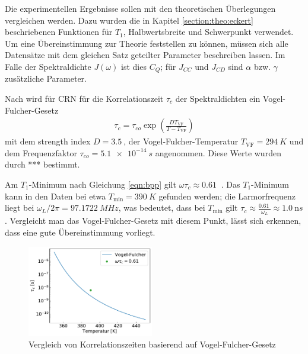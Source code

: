Die experimentellen Ergebnisse sollen mit den theoretischen Überlegungen vergleichen werden. Dazu wurden die in Kapitel \ref{section:theo:eckert} beschriebenen Funktionen für $T_1$, Halbwertsbreite und Schwerpunkt verwendet. Um eine Übereinstimmung zur Theorie feststellen zu können, müssen sich alle Datensätze mit dem gleichen Satz geteilter Parameter beschreiben lassen. Im Falle der Spektraldichte $J(\omega)$ ist dies $C_Q$; für $J_{CC}$ und $J_{CD}$ sind $\alpha$ bzw. $\gamma$ zusätzliche Parameter.


Nach \cite{PIMENOV199793} wird für CRN für die Korrelationszeit $\tau_c$ der Spektraldichten ein Vogel-Fulcher-Gesetz
\begin{align}
	\tau_c = \tau_{co} \exp \left( \frac{D T_\text{VF}}{T-T_\text{VF}} \right)
\end{align}
mit dem strength index $D = \SI{3.5}{}$, der Vogel-Fulcher-Temperatur $T_\text{VF} = \SI{294}{K}$ und dem Frequenzfaktor $\tau_{co} = \SI{5.1e-14}{s}$ angenommen. Diese Werte wurden durch *** bestimmt.

Am $T_1$-Minimum nach Gleichung \eqref{eqn:bpp} gilt $\omega \tau_c \approx \SI{0.61}{}$ \cite[S. 629]{omegatau061}. Das $T_1$-Minimum kann in den Daten bei etwa $T_\text{min} = \SI{390}{K}$ gefunden werden; die Larmorfrequenz liegt bei $\omega_L / 2\pi = \SI{97.1722}{MHz}$, was bedeutet, dass bei $T_\text{min}$ gilt $\tau_c \approx \frac{\SI{0.61}{}}{\omega_L} \approx \SI{1.0}{\nano s}$. Vergleicht man das Vogel-Fulcher-Gesetz mit diesem Punkt, lässt sich erkennen, dass eine gute Übereinstimmung vorliegt.
\begin{figure}
	\vspace{-20pt}
	\begin{center}
		\includegraphics[width=0.49\textwidth]{graphics/zwischenbericht/tau_c_arrhenius_vogel_fulcher.pdf}
	\end{center}
	\vspace{-20pt}
	\caption{Vergleich von Korrelationszeiten basierend auf Vogel-Fulcher-Gesetz \label{fig:korrelationszeiten}}
\end{figure}


